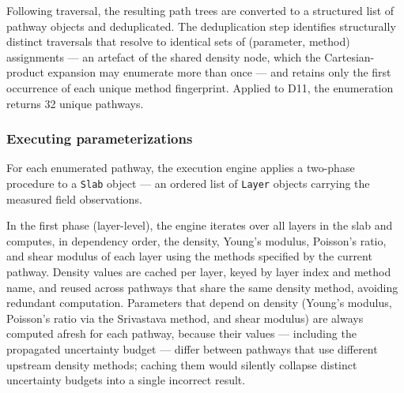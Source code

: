 \documentclass[hess, manuscript]{copernicus}
\begin{document}
Following traversal, the resulting path trees are converted to a structured list of pathway objects and deduplicated. The deduplication step identifies structurally distinct traversals that resolve to identical sets of (parameter, method) assignments --- an artefact of the shared density node, which the Cartesian-product expansion may enumerate more than once --- and retains only the first occurrence of each unique method fingerprint. Applied to D11, the enumeration returns 32 unique pathways.

\subsubsection{Executing parameterizations}


For each enumerated pathway, the execution engine applies a two-phase procedure to a \texttt{Slab} object --- an ordered list of \texttt{Layer} objects carrying the measured field observations.

In the first phase (layer-level), the engine iterates over all layers in the slab and computes, in dependency order, the density, Young's modulus, Poisson's ratio, and shear modulus of each layer using the methods specified by the current pathway. Density values are cached per layer, keyed by layer index and method name, and reused across pathways that share the same density method, avoiding redundant computation. Parameters that depend on density (Young's modulus, Poisson's ratio via the Srivastava method, and shear modulus) are always computed afresh for each pathway, because their values --- including the propagated uncertainty budget --- differ between pathways that use different upstream density methods; caching them would silently collapse distinct uncertainty budgets into a single incorrect result.
\end{document}
